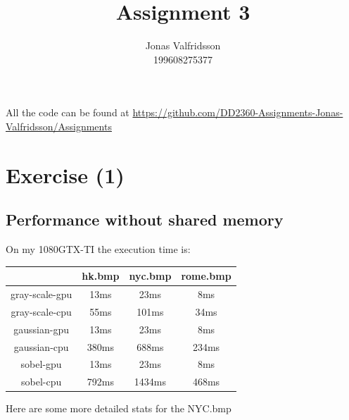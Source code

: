 \documentclass{article}
\title{Assignment 3}
\date{}
\author{Jonas Valfridsson\\199608275377}
\begin{document}
\maketitle
\tableofcontents




All the code can be found at \href{https://github.com/DD2360-Assignments-Jonas-Valfridsson/Assignments}{https://github.com/DD2360-Assignments-Jonas-Valfridsson/Assignments}

\newpage  


\section{Exercise (1)}%

\subsection{Performance without shared memory}%
\label{ssub:performance_of_shared_memory}



On my 1080GTX-TI the execution time is:

\begin{center}
  \begin{tabular}{ | c | c | c | c | }
    \hline
           & hk.bmp & nyc.bmp & rome.bmp\\ \hline
           gray-scale-gpu & 13ms & 23ms & 8ms\\ \hline
           gray-scale-cpu & 55ms & 101ms & 34ms\\ \hline
            gaussian-gpu & 13ms & 23ms & 8ms\\ \hline
           gaussian-cpu & 380ms & 688ms & 234ms \\ \hline
            sobel-gpu & 13ms & 23ms & 8ms \\  \hline
            sobel-cpu & 792ms & 1434ms & 468ms \\  \hline
    \hline
  \end{tabular}
\end{center}

Here are some more detailed stats for the NYC.bmp
\end{document}
